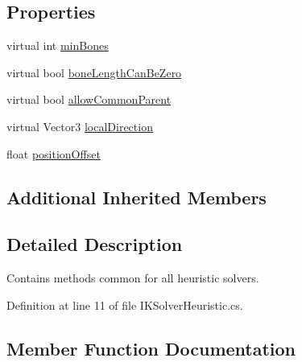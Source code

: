 \subsection*{Properties}
\begin{DoxyCompactItemize}
\item 
virtual int \mbox{\hyperlink{class_root_motion_1_1_final_i_k_1_1_i_k_solver_heuristic_a837481e0f271443eafa1fc92e5df68e3}{min\+Bones}}
\item 
virtual bool \mbox{\hyperlink{class_root_motion_1_1_final_i_k_1_1_i_k_solver_heuristic_a4df0a7c687d140f74369b5a698b4f0db}{bone\+Length\+Can\+Be\+Zero}}
\item 
virtual bool \mbox{\hyperlink{class_root_motion_1_1_final_i_k_1_1_i_k_solver_heuristic_ac092d123e218306963b4bcd569f403fb}{allow\+Common\+Parent}}
\item 
virtual Vector3 \mbox{\hyperlink{class_root_motion_1_1_final_i_k_1_1_i_k_solver_heuristic_ab69f50217e48a3cc1c5f2a031a2cbc82}{local\+Direction}}
\item 
float \mbox{\hyperlink{class_root_motion_1_1_final_i_k_1_1_i_k_solver_heuristic_a05caefab9fbc925be49373cebfc9faf9}{position\+Offset}}
\end{DoxyCompactItemize}
\subsection*{Additional Inherited Members}


\subsection{Detailed Description}
Contains methods common for all heuristic solvers. 



Definition at line 11 of file I\+K\+Solver\+Heuristic.\+cs.



\subsection{Member Function Documentation}
\mbox{\label{class_root_motion_1_1_final_i_k_1_1_i_k_solver_heuristic_a034922fce9f0ca8db348f67c7c0101ce}} 
